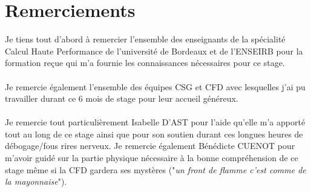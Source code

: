 \section*{Remerciements}%
Je tiens tout d'abord à remercier l'ensemble des enseignants de la spécialité Calcul Haute Performance de l'université de Bordeaux et de l'ENSEIRB pour la formation reçue qui m'a fournie les connaissances nécessaires pour ce stage.

\paragraph{}Je remercie également l'ensemble des équipes CSG et CFD avec lesquelles j'ai pu travailler durant ce 6 mois de stage pour leur accueil généreux.

\paragraph{}Je remercie tout particulièrement Isabelle D'AST pour l'aide qu'elle m'a apporté tout au long de ce stage ainsi que pour son soutien durant ces longues heures de débogage/fous rires nerveux. Je remercie également Bénédicte CUENOT pour m'avoir guidé sur la partie physique nécessaire à la bonne compréhension de ce stage même si la CFD gardera ses mystères ("\textit{un front de flamme c'est comme de la mayonnaise}").
